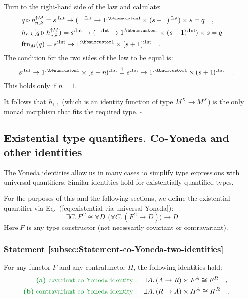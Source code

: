 Turn to the right-hand side of the law and calculate:
\begin{align*}
 & q\triangleright h_{n,k}^{\uparrow M}=s^{:\text{Int}}\rightarrow(\_^{:\text{Int}}\rightarrow1^{:\bbnum 1}\times(s+1)^{:\text{Int}})\times s=q\quad,\\
 & h_{n,k}(q\triangleright h_{n,k}^{\uparrow M})=s^{:\text{Int}}\rightarrow(\_^{:\text{Int}}\rightarrow1^{:\bbnum 1}\times(s+1)^{:\text{Int}})\times s=q\quad,\\
 & \text{ftn}_{M}(q)=s^{:\text{Int}}\rightarrow1^{:\bbnum 1}\times(s+1)^{:\text{Int}}\quad.
\end{align*}
The condition for the two sides of the law to be equal is:
\[
s^{:\text{Int}}\rightarrow1^{:\bbnum 1}\times(s+n)^{:\text{Int}}\overset{?}{=}s^{:\text{Int}}\rightarrow1^{:\bbnum 1}\times(s+1)^{:\text{Int}}\quad.
\]
This holds only if $n=1$.

It follows that $h_{1,1}$ (which is an identity function of type
$M^{X}\rightarrow M^{X}$) is the only monad morphism that fits the
required type. $\square$

\subsection{Existential type quantifiers. Co-Yoneda and other identities}

The Yoneda identities allow us in many cases to simplify type expressions
with universal quantifiers. Similar identities hold for existentially
quantified types.

For the purposes of this and the following sections, we define the
existential quantifier via Eq.~(\ref{eq:existential-via-universal-Yoneda}):
\[
\exists C.\,F^{C}\cong\forall D.\,\big(\forall C.\,(F^{C}\rightarrow D)\big)\rightarrow D\quad.
\]
Here $F$ is any type constructor (not necessarily covariant or contravariant).

\subsubsection{Statement \label{subsec:Statement-co-Yoneda-two-identities}\ref{subsec:Statement-co-Yoneda-two-identities}}

For any functor $F$ and any contrafunctor $H$, the following identities
hold:
\begin{align*}
{\color{greenunder}\text{\textbf{(a)} }\text{covariant co-Yoneda identity}:}\quad & \exists A.\,(A\rightarrow R)\times F^{A}\cong F^{R}\quad,\\
{\color{greenunder}\text{\textbf{(b)} }\text{contravariant co-Yoneda identity}:}\quad & \exists A.\,(R\rightarrow A)\times H^{A}\cong H^{R}\quad.
\end{align*}


